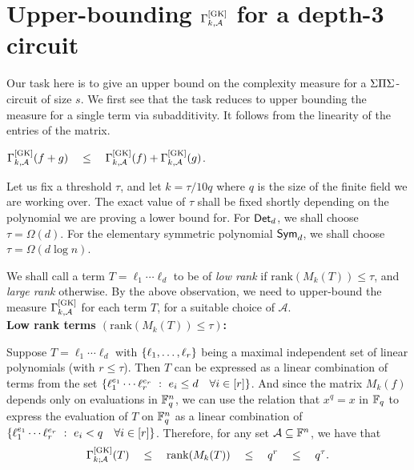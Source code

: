 \section{Upper-bounding $\Gamma^{\mathrm{[GK]}}_{k,\mathcal{A}}$ for a depth-3 circuit}\label{sec:gk-upper-bound}

Our task here is to give an upper bound on the complexity measure for
a $\Sigma\Pi\Sigma$-circuit of size $s$. 
We first see that the task reduces to
upper bounding the measure for a single term via subadditivity. 
It
follows from the linearity of the entries of the matrix.

\begin{observation}\label{obs:GK-subadditivity}
  $\Gamma^{\mathrm{[GK]}}_{k,\mathcal{A}}(f + g) \quad\leq\quad
  \Gamma^{\mathrm{[GK]}}_{k,\mathcal{A}}(f) + \Gamma^{\mathrm{[GK]}}_{k,\mathcal{A}}(g)$.
\end{observation}

Let us fix a threshold $\tau$, and let $k = \tau/10q$ where $q$ is the size of the finite field we are working over.
The exact value of $\tau$ shall be fixed shortly depending on the polynomial we are proving a lower bound for. 
For $\operatorname{\mathsf{Det}}_d$, we shall choose $\tau = \Omega(d)$.
For the elementary symmetric polynomial $\operatorname{\mathsf{Sym}}_d$, we shall choose $\tau = \Omega(d \log n)$. 
 
We shall call a term $T = \ell_1\cdots \ell_d$ to be
of \emph{low rank} if $\mathrm{rank}(M_k(T)) \leq \tau$, and \emph{large
  rank} otherwise. 
By the above observation, we need to upper-bound
the measure $\Gamma^{\mathrm{[GK]}}_{k,\mathcal{A}}$ for each term $T$, for a
suitable choice of $\mathcal{A}$.\\

\noindent 
{\bf Low rank terms $(\mathrm{rank}(M_{k}(T)) \leq \tau)$:}

Suppose $T = \ell_1 \cdots \ell_d$ with $\left\{\ell_1, \dots,
  \ell_r\right\}$ being a maximal independent set of linear polynomials (with
$r \leq \tau$). 
Then $T$ can be expressed as a linear combination of
terms from the set $\left\{{\ell_1^{e_1}\cdots \ell_r^{e_r}}\ : \ {e_i\leq d
  \quad \forall i\in [r]}\right\}$. 
And since the matrix $M_k(f)$ depends only
on evaluations in $\mathbb{F}_q^{n}$, we can use the relation that $x^q = x$
in $\mathbb{F}_q$ to express the evaluation of  $T$ on $\mathbb{F}_q^{n}$ as a linear
combination of $\left\{{\ell_1^{e_1}\cdots \ell_r^{e_r}}\ : \ {e_i<q \quad
  \forall i\in [r]}\right\}$. 
Therefore, for any set $\mathcal{A}\subseteq
\mathbb{F}^{n}$, we have that
$$
\Gamma^{\mathrm{[GK]}}_{k;\mathcal{A}}(T) \quad \leq \quad
\mathrm{rank}(M_k(T)) \quad \leq \quad q^r \quad\leq \quad q^{\tau}.
$$


